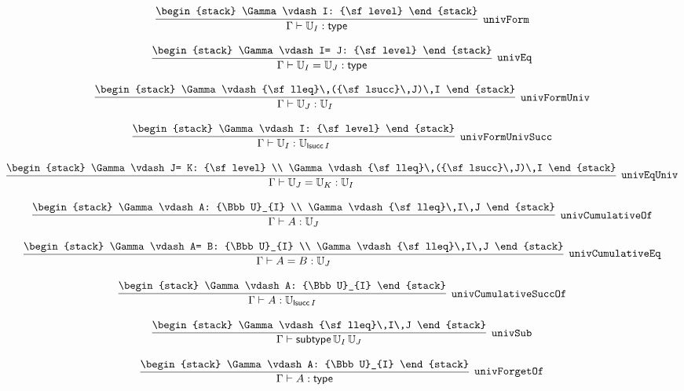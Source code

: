 \[
\infer[{\tt univForm}]{\Gamma \vdash {\Bbb U}_{I}: {\sf type}}{
\begin{stack}
\Gamma \vdash I: {\sf level}
\end{stack}}
\]

\[
\infer[{\tt univEq}]{\Gamma \vdash {\Bbb U}_{I}= {\Bbb U}_{J}: {\sf type}}{
\begin{stack}
\Gamma \vdash I= J: {\sf level}
\end{stack}}
\]

\[
\infer[{\tt univFormUniv}]{\Gamma \vdash {\Bbb U}_{J}: {\Bbb U}_{I}}{
\begin{stack}
\Gamma \vdash {\sf lleq}\,({\sf lsucc}\,J)\,I
\end{stack}}
\]

\[
\infer[{\tt univFormUnivSucc}]{\Gamma \vdash {\Bbb U}_{I}: {\Bbb U}_{{\sf lsucc}\,I}}{
\begin{stack}
\Gamma \vdash I: {\sf level}
\end{stack}}
\]

\[
\infer[{\tt univEqUniv}]{\Gamma \vdash {\Bbb U}_{J}= {\Bbb U}_{K}: {\Bbb U}_{I}}{
\begin{stack}
\Gamma \vdash J= K: {\sf level}
\\
\Gamma \vdash {\sf lleq}\,({\sf lsucc}\,J)\,I
\end{stack}}
\]

\[
\infer[{\tt univCumulativeOf}]{\Gamma \vdash A: {\Bbb U}_{J}}{
\begin{stack}
\Gamma \vdash A: {\Bbb U}_{I}
\\
\Gamma \vdash {\sf lleq}\,I\,J
\end{stack}}
\]

\[
\infer[{\tt univCumulativeEq}]{\Gamma \vdash A= B: {\Bbb U}_{J}}{
\begin{stack}
\Gamma \vdash A= B: {\Bbb U}_{I}
\\
\Gamma \vdash {\sf lleq}\,I\,J
\end{stack}}
\]

\[
\infer[{\tt univCumulativeSuccOf}]{\Gamma \vdash A: {\Bbb U}_{{\sf lsucc}\,I}}{
\begin{stack}
\Gamma \vdash A: {\Bbb U}_{I}
\end{stack}}
\]

\[
\infer[{\tt univSub}]{\Gamma \vdash {\sf subtype}\,{\Bbb U}_{I}\,{\Bbb U}_{J}}{
\begin{stack}
\Gamma \vdash {\sf lleq}\,I\,J
\end{stack}}
\]

\[
\infer[{\tt univForgetOf}]{\Gamma \vdash A: {\sf type}}{
\begin{stack}
\Gamma \vdash A: {\Bbb U}_{I}
\end{stack}}
\]

